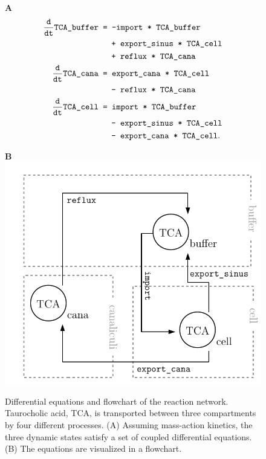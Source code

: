 \documentclass[article]{jss}
\begin{document}
\begin{figure}[ht]
	\centering
	\begin{minipage}{0.55\textwidth}
		\textbf{A}
		\begin{equation*}
			\begin{aligned}
				\frac{\texttt d}{ \texttt{dt} } \verb!TCA_buffer! &\texttt{ = } \verb!-import * TCA_buffer!\\
				& \quad \verb! + export_sinus * TCA_cell!\\
				& \quad \verb! + reflux * TCA_cana!\\
				\frac{\texttt d}{ \texttt{dt}} \verb!TCA_cana! &\texttt{ = } \verb!export_cana * TCA_cell!\\
				& \quad \verb! - reflux * TCA_cana!\\
				\frac{\texttt d}{ \texttt{dt}} \verb!TCA_cell! &\texttt{ = } \verb!import * TCA_buffer!\\
				& \quad \verb! - export_sinus * TCA_cell!\\
				&\quad \verb! - export_cana * TCA_cell!.
			\end{aligned}
		\end{equation*}
	\end{minipage}
	\begin{minipage}{0.44\textwidth}
		\textbf{B}\\
	\includegraphics[width = \textwidth]{images/flowchart}
	\end{minipage}
	\caption{Differential equations and flowchart of the reaction network. Taurocholic acid,  TCA, is transported between three compartments by four different processes. (A) Assuming mass-action kinetics, the three dynamic states satisfy a set of coupled differential equations. (B) The equations are visualized in a flowchart. }
	\label{fig:flowchart}
\end{figure}
\end{document}
